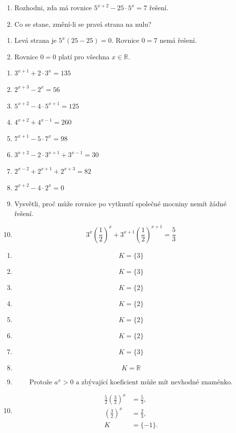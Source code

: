 \documentclass[11pt,a4paper]{article}
\begin{document}
\begin{zadaniReseniBox}[title={Rozšíření 1}]
\begin{enumerate}[label=\alph*)]
\item Rozhodni, zda má rovnice $5^{x+2}-25\cdot5^x=7$ řešení.
\item Co se stane, změní-li se pravá strana na nulu?
\end{enumerate}
\tcblower
\begin{enumerate}[label=\alph*)]
\item Levá strana je $5^x(25-25)=0$. Rovnice $0=7$ nemá řešení.
\item Rovnice $0=0$ platí pro všechna $x\in\mathbb R$.
\end{enumerate}
\end{zadaniReseniBox}
\begin{zadaniReseniBox}[title={Domácí úkol}]
\begin{enumerate}[label=\alph*)]
\item $3^{x+1}+2\cdot3^x=135$
\item $2^{x+3}-2^x=56$
\item $5^{x+2}-4\cdot5^{x+1}=125$
\item $4^{x+2}+4^{x-1}=260$
\item $7^{x+1}-5\cdot7^x=98$
\item $3^{x+2}-2\cdot3^{x+1}+3^{x-1}=30$
\item $2^{x-2}+2^{x+1}+2^{x+3}=82$
\item $2^{x+2}-4\cdot2^x=0$
\item Vysvětli, proč může rovnice po vytknutí společné mocniny nemít žádné řešení.
\item \[ 3^x\left(\frac{1}{2}\right)^x+3^{x+1}\left(\frac{1}{2}\right)^{x+1}=\frac{5}{3} \]
\end{enumerate}
\tcblower
\setlength{\abovedisplayskip}{2pt}\setlength{\belowdisplayskip}{2pt}
\setlength{\abovedisplayshortskip}{2pt}\setlength{\belowdisplayshortskip}{2pt}
\begin{enumerate}[label=\alph*)]
\item \[K=\{3\}\]
\item \[K=\{3\}\]
\item \[K=\{2\}\]
\item \[K=\{2\}\]
\item \[K=\{2\}\]
\item \[K=\{2\}\]
\item \[K=\{3\}\]
\item \[K=\mathbb R\]
\item \[\text{Protože }a^x>0\text{ a zbývající koeficient může mít nevhodné znaménko.}\]
\item \[\begin{aligned}\frac{5}{2}\left(\frac{3}{2}\right)^x&=\frac{5}{3},\\\left(\frac{3}{2}\right)^x&=\frac{2}{3},\\K&=\{-1\}.\end{aligned}\]
\end{enumerate}
\end{zadaniReseniBox}
\end{document}
